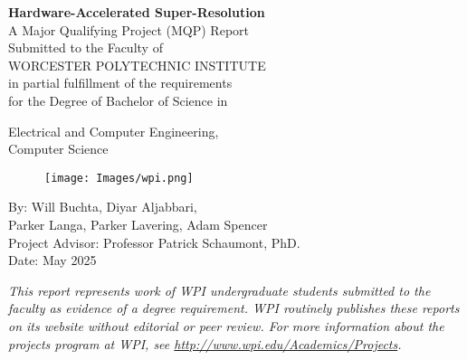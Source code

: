 \documentclass{article}
\begin{document}
 



\begin{center}
    \Huge{\textbf{Hardware-Accelerated Super-Resolution}} \\ %
    \vspace{10mm} %
    \large{
    A Major Qualifying Project (MQP) Report \\
    Submitted to the Faculty of \\
    WORCESTER POLYTECHNIC INSTITUTE \\
    in partial fulfillment of the requirements \\
    for the Degree of Bachelor of Science in \\
    } %
    \Large{
    \vspace{3mm} %
    Electrical and Computer Engineering, \\ %
    Computer Science \\ %
   \vspace{18mm} %

    \begin{figure}[h]
        \centering
        \texttt{[image: Images/wpi.png]} %
        \label{fig:example}
    \end{figure}
    
   \vspace{22mm} %
    By:
    Will Buchta,  %
    Diyar Aljabbari, \\ %
    Parker Langa, 
    Parker Lavering,
    Adam Spencer \\
    \vspace {18mm} %
    Project Advisor: %
    \vspace{2mm} %
    Professor Patrick Schaumont, PhD. \\ %
    \vspace {2mm} %
    Date: May 2025 \\ %
    }
    \vspace{5mm} %
    \large{\textit{This report represents work of WPI undergraduate students submitted to the faculty as evidence of a degree requirement. WPI routinely publishes these reports on its website without editorial or peer review. For more information about the projects program at WPI, see \url{http://www.wpi.edu/Academics/Projects}.}} %
\end{center}
\end{document}
